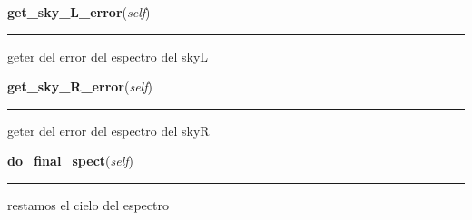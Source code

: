     \label{spectro_metria:spect:get_sky_L_error}

    \vspace{0.5ex}

\hspace{.8\funcindent}\begin{boxedminipage}{\funcwidth}

    \raggedright \textbf{get\_sky\_L\_error}(\textit{self})

    \vspace{-1.5ex}

    \rule{\textwidth}{0.5\fboxrule}
\setlength{\parskip}{2ex}
    geter del error del espectro del skyL

\setlength{\parskip}{1ex}
    \end{boxedminipage}

    \label{spectro_metria:spect:get_sky_R_error}

    \vspace{0.5ex}

\hspace{.8\funcindent}\begin{boxedminipage}{\funcwidth}

    \raggedright \textbf{get\_sky\_R\_error}(\textit{self})

    \vspace{-1.5ex}

    \rule{\textwidth}{0.5\fboxrule}
\setlength{\parskip}{2ex}
    geter del error del espectro del skyR

\setlength{\parskip}{1ex}
    \end{boxedminipage}

    \label{spectro_metria:spect:do_final_spect}

    \vspace{0.5ex}

\hspace{.8\funcindent}\begin{boxedminipage}{\funcwidth}

    \raggedright \textbf{do\_final\_spect}(\textit{self})

    \vspace{-1.5ex}

    \rule{\textwidth}{0.5\fboxrule}
\setlength{\parskip}{2ex}
    restamos el cielo del espectro

\setlength{\parskip}{1ex}
    \end{boxedminipage}

